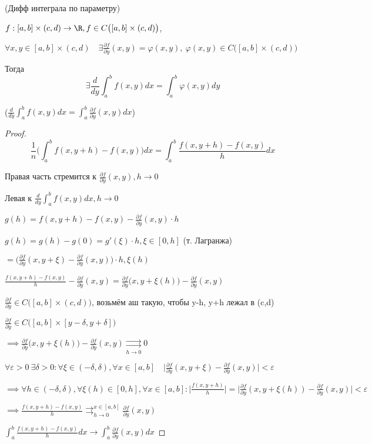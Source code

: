   \begin{theorem}
    (Дифф интеграла по параметру)

    $f: [a,b] \times (c,d) \to \R, f \in C\big([a,b]\times (c,d)\big)$,
    
    $\forall x, y \in [a,b]\times(c,d) \quad \exists \frac{\partial f}{\partial y}(x,y) = \varphi(x,y), \ \varphi(x,y) \in C\big([a,b]\times(c,d)\big)$

    Тогда $$\exists \frac{d}{dy}\int^b_a f(x,y)dx = \int^b_a\varphi(x,y)dy$$

    ($\frac{d}{dy}\int^b_af(x,y)dx = \int^b_a\frac{\partial f}{\partial y}(x,y)dx$)
  \end{theorem}
\begin{proof}
  $$\frac{1}{n} \Big(\int^b_a f(x,y+h) - f(x,y)\Big)dx = \int^b_a \frac{f(x,y+h) - f(x,y)}{h}dx$$

  Правая часть стремится к $\frac{\partial f}{\partial y}(x,y), h\to 0$

  Левая к $\frac{d}{dy}\int^b_a f(x,y)dx, h \to 0$

  $g(h) = f(x,y+h) - f(x,y) - \frac{\partial f}{\partial y}(x,y)\cdot h$

  $g(h) = g(h) - g(0) = g'(\xi)\cdot h, \xi \in [0,h]$ (т. Лагранжа)

  $= \Big(\frac{\partial f}{\partial y}(x,y+\xi) - \frac{\partial f }{\partial y}(x,y)\Big)\cdot h, \xi (h)$

  $\frac{f(x,y+h) - f(x,y)}{h} - \frac{\partial f}{\partial y}(x,y) = \frac{\partial f}{\partial y}\big(x, y+ \xi(h)\big) - \frac{\partial f}{\partial y}(x,y)$

  $\frac{\partial f}{\partial y} \in C\big([a,b]\times (c,d)\big)$, возьмём аш такую, чтобы y-h, y+h лежал в (c,d)

  $\frac{\partial f}{\partial y} \in C\big([a,b] \times [y - \delta, y+\delta]\big)$

  $\implies \frac{\partial f}{\partial y}\big(x, y+\xi(h)\big) - \frac{\partial f}{\partial y}(x,y)\underset{h\to 0}{\rightrightarrows} 0$
  
  $\forall \varepsilon > 0 \ \exists \delta > 0: \forall \xi \in (-\delta, \delta), \forall x \in [a,b] \quad \Big| \frac{\partial f}{\partial y}(x,y+\xi) - \frac{\partial f}{\partial y}(x,y) \big| < \varepsilon$

  $\implies \forall h \in (-\delta, \delta), \forall \xi(h) \in [0, h], \forall x \in [a,b]: \Big|\frac{f(x,y+h)}{h} \Big| = \Big| \frac{\partial f}{\partial y}(x,y + \xi(h)) - \frac{\partial f}{\partial y}(x,y)\Big| < \varepsilon$

  $\implies \frac{f(x,y + h) - f(x,y)}{h} \rightrightarrows^{x\in[a,b]}_{h\to 0} \frac{\partial f}{\partial y}(x,y)$

  $\int^b_a \frac{f(x,y+h) - f(x,y)}{h}dx \longrightarrow \int^b_a \frac{\partial f}{\partial y}(x,y)dx$


\end{proof}

  
